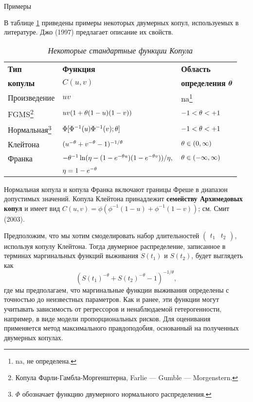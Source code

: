         \begin{center}Примеры\end{center}
        \noindent

В таблице \ref{tab:19.1} приведены примеры некоторых двумерных копул, используемых в литературе. Джо (1997) предлагает описание их свойств.

    \begin{table}[!htbp]\caption{\textit{Некоторые стандартные функции Копула}}\label{tab:19.1}
    \begin{center}
\begin{minipage}{12cm}
\begin{tabular}{lll}
\hline \hline
\textbf{Тип}                   &   \textbf{Функция}                         &\textbf{Область}\\
\textbf{копулы}                & $C(u, v)$                                  &\textbf{определения} $\bm{\theta}$\\
\hline
Произведение    
&$uv$                                                       
&na\footnote{na, не определена.} \\
FGMS\footnote{Копула Фарли-Гамбла-Моргенштерна, Farlie --- Gumble --- Morgenstern.}        
&$uv(1 + \theta(1 - u)(1 - v))$                                       
&$-1 < \theta < +1$ \\
Нормальная\footnote{$\Phi$ обозначает функцию двумерного нормального распределения.}  
&$\Phi[\Phi^{-1}(u) \Phi^{-1}(v);\theta]$                             
&$-1 < \theta < +1$\\
Клейтона        
&$(u^{-\theta} + v^{-\theta} - 1)^{-1/\theta}$                           
&$\theta \in (0, \infty)$\\
Франка         
&$-\theta^{-1}\ln(\eta - (1 - e^{-\theta u})(1 - e^{-\theta v}))/\eta,$   
&$\theta \in (-\infty, \infty)$\\
&$\eta = 1 - e^{-\theta}$\\
\hline \hline
\end{tabular}
\end{minipage}
    \end{center}
    \end{table}

Нормальная копула и копула Франка включают границы Фреше в диапазон допустимых значений. Копула Клейтона принадлежит \textbf{семейству Архимедовых копул} и имеет вид $C(u, v) = \phi (\phi^{-1}(1 - u) + \phi^{-1}(1 - v))$; см. Смит (2003).

Предположим, что мы хотим смоделировать набор длительностей $\begin{pmatrix} t_1 & t_2 \end{pmatrix}$, используя копулу Клейтона. Тогда двумерное распределение, записанное в терминах маргинальных функций выживания $S(t_1)$ и $S(t_2)$, будет выглядеть как
    $$(S(t_1)^{-\theta} + S(t_2)^{-\theta} - 1)^{-1/\theta},$$
где мы предполагаем, что маргинальные функции выживания определены с точностью до неизвестных параметров. Как и ранее, эти функции могут учитывать зависимость от регрессоров и ненаблюдаемой гетерогенности, например, в виде модели пропорциональных рисков. Для оценивания применяется метод максимального правдоподобия, основанный на полученных двумерных копулах.

